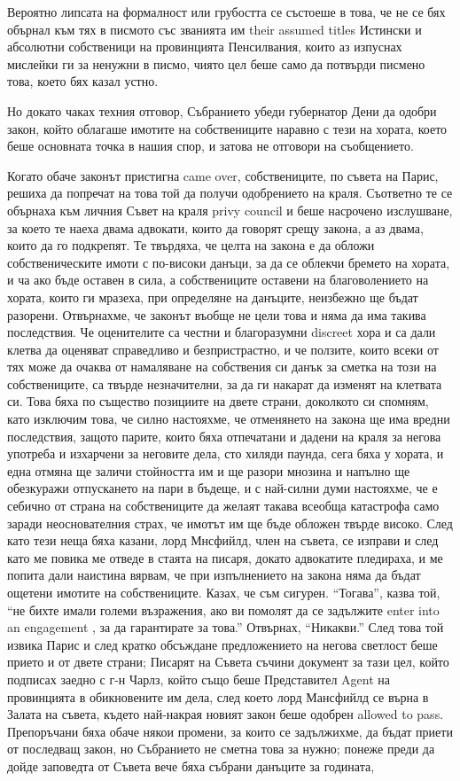 \documentclass[12pt]{book}
\begin{document}
Вероятно липсата на формалност или грубостта се състоеше в това, че не се бях обърнал към тях в писмото със званията им their assumed titles Истински и абсолютни собственици на провинцията Пенсилвания, които аз изпуснах мислейки ги за ненужни в писмо, чиято цел беше само да потвърди писмено това, което бях казал устно.

Но докато чаках техния отговор, Събранието убеди губернатор Дени да одобри закон, който облагаше имотите на собствениците наравно с тези на хората, което беше основната точка в нашия спор, и затова не отговори на съобщението. 

Когато обаче законът пристигна came over, собствениците, по съвета на Парис, решиха да попречат на това той да получи одобрението на краля. Съответно те се обърнаха към личния Съвет на краля privy council и беше насрочено изслушване, за което те наеха двама адвокати, които да говорят срещу закона, а аз двама, които да го подкрепят. Те твърдяха, че целта на закона е да обложи собственическите имоти с по-високи данъци, за да се облекчи бремето на хората, и ча ако бъде оставен в сила, а собствениците оставени на благоволението на хората, които ги мразеха, при определяне на данъците, неизбежно ще бъдат разорени. Отвърнахме, че законът въобще не цели това и няма да има такива последствия. Че оценителите са честни и благоразумни discreet хора и са дали клетва да оценяват справедливо и безпристрастно, и че ползите, които всеки от тях може да очаква от намаляване на собствения си данък за сметка на този на собствениците, са твърде незначителни, за да ги накарат да изменят на клетвата си. Това бяха по същество позициите на двете страни, доколкото си спомням, като изключим това, че силно настояхме, че отменянето на закона ще има вредни последствия, защото парите, които бяха отпечатани и дадени на краля за негова употреба и изхарчени за неговите дела, сто хиляди паунда, сега бяха у хората, и една отмяна ще заличи стойността им и ще разори мнозина и напълно ще обезкуражи отпускането на пари в бъдеще, и с най-силни думи настояхме, че е себично от страна на собствениците да желаят такава всеобща катастрофа само заради неоснователния страх, че имотът им ще бъде обложен твърде високо. След като тези неща бяха казани, лорд Мнсфийлд, член на съвета, се изправи и след като ме повика ме отведе в стаята на писаря, докато адвокатите пледираха, и ме попита дали наистина вярвам, че при изпълнението на закона няма да бъдат ощетени имотите на собствениците. Казах, че съм сигурен. “Тогава”, казва той, “не бихте имали големи възражения, ако ви помолят да се задължите enter into an engagement , за да гарантирате за това.” Отвърнах, “Никакви.” След това той извика Парис и след кратко обсъждане предложението на негова светлост беше прието и от двете страни; Писарят на Съвета съчини документ за тази цел, който подписах заедно с г-н Чарлз, който също беше Представител Agent на провинцията в обикновените им дела, след което лорд Мансфийлд се върна в Залата на съвета, където най-накрая новият закон беше одобрен allowed to pass. Препоръчани бяха обаче някои промени, за които се задължихме, да бъдат приети от последващ закон, но Събранието не сметна това за нужно; понеже преди да дойде заповедта от Съвета вече бяха събрани данъците за годината, 
\end{document}
